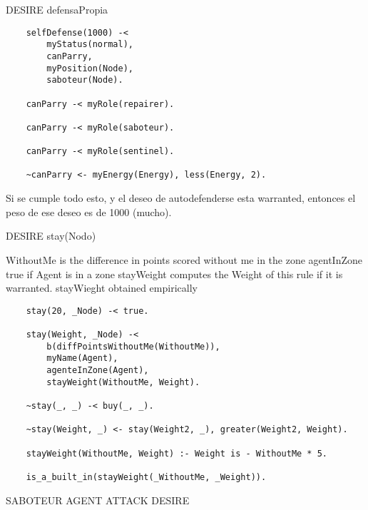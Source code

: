     DESIRE defensaPropia
    
    \begin{small}
    \begin{verbatim}
    selfDefense(1000) -<
        myStatus(normal),
        canParry,
        myPosition(Node),
        saboteur(Node).  

    canParry -< myRole(repairer).
        
    canParry -< myRole(saboteur).
        
    canParry -< myRole(sentinel).
        
    ~canParry <- myEnergy(Energy), less(Energy, 2). 
    \end{verbatim}
    \end{small}
 
    Si se cumple todo esto, y el deseo de autodefenderse esta warranted,
    entonces el peso de ese deseo es de 1000 (mucho).

    DESIRE stay(Nodo)

    WithoutMe is the difference in points scored without me in the zone 
    agentInZone true if Agent is in a zone                                          
    stayWeight computes the Weight of this rule if it is warranted.                
    stayWieght obtained empirically

    \begin{small}
    \begin{verbatim}
    stay(20, _Node) -< true.

    stay(Weight, _Node) -< 
        b(diffPointsWithoutMe(WithoutMe)),
        myName(Agent),                    
        agenteInZone(Agent),              
        stayWeight(WithoutMe, Weight).    

    ~stay(_, _) -< buy(_, _).

    ~stay(Weight, _) <- stay(Weight2, _), greater(Weight2, Weight).

    stayWeight(WithoutMe, Weight) :- Weight is - WithoutMe * 5.
        
    is_a_built_in(stayWeight(_WithoutMe, _Weight)).
    \end{verbatim}
    \end{small}

    SABOTEUR AGENT ATTACK DESIRE

